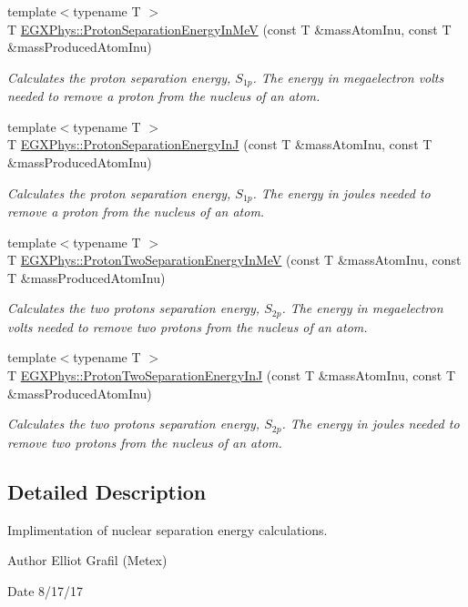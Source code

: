 \begin{DoxyCompactItemize}
{\footnotesize template$<$typename T $>$ }\\T \hyperlink{group___nuclear_separation_energy_ga6a619ded55c47ed22ea2d8a85202ebeb}{E\+G\+X\+Phys\+::\+Proton\+Separation\+Energy\+In\+MeV} (const T \&mass\+Atom\+Inu, const T \&mass\+Produced\+Atom\+Inu)
\begin{DoxyCompactList}\small\item\em Calculates the proton separation energy, $S_{1p}$. The energy in megaelectron volts needed to remove a proton from the nucleus of an atom. \end{DoxyCompactList}\item 
{\footnotesize template$<$typename T $>$ }\\T \hyperlink{group___nuclear_separation_energy_ga4274d8f5a3860169fd81970707eb582a}{E\+G\+X\+Phys\+::\+Proton\+Separation\+Energy\+InJ} (const T \&mass\+Atom\+Inu, const T \&mass\+Produced\+Atom\+Inu)
\begin{DoxyCompactList}\small\item\em Calculates the proton separation energy, $S_{1p}$. The energy in joules needed to remove a proton from the nucleus of an atom. \end{DoxyCompactList}\item 
{\footnotesize template$<$typename T $>$ }\\T \hyperlink{group___nuclear_separation_energy_ga0de42783a7c650eb32f85dc2d40d84d7}{E\+G\+X\+Phys\+::\+Proton\+Two\+Separation\+Energy\+In\+MeV} (const T \&mass\+Atom\+Inu, const T \&mass\+Produced\+Atom\+Inu)
\begin{DoxyCompactList}\small\item\em Calculates the two protons separation energy, $S_{2p}$. The energy in megaelectron volts needed to remove two protons from the nucleus of an atom. \end{DoxyCompactList}\item 
{\footnotesize template$<$typename T $>$ }\\T \hyperlink{group___nuclear_separation_energy_gad7c1d4a32daa8aaa53c5fce37c421f82}{E\+G\+X\+Phys\+::\+Proton\+Two\+Separation\+Energy\+InJ} (const T \&mass\+Atom\+Inu, const T \&mass\+Produced\+Atom\+Inu)
\begin{DoxyCompactList}\small\item\em Calculates the two protons separation energy, $S_{2p}$. The energy in joules needed to remove two protons from the nucleus of an atom. \end{DoxyCompactList}\end{DoxyCompactItemize}


\subsection{Detailed Description}
Implimentation of nuclear separation energy calculations. 

\begin{DoxyAuthor}{Author}
Elliot Grafil (Metex) 
\end{DoxyAuthor}
\begin{DoxyDate}{Date}
8/17/17 
\end{DoxyDate}
